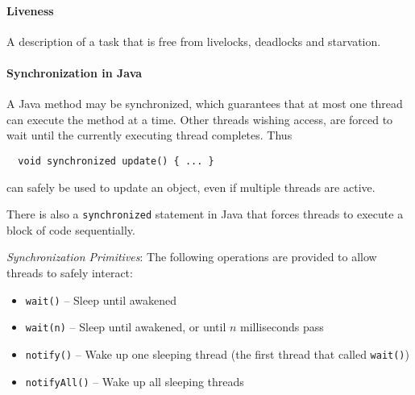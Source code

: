 \paragraph{Liveness} A description of a task that is free from livelocks, deadlocks and starvation.



\paragraph{Synchronization in Java} A Java method may be synchronized, which guarantees that at most one thread can execute the method at a time. Other threads wishing access, are forced to wait until the currently executing thread completes. Thus
%
\begin{lstlisting}
  void synchronized update() { ... }
\end{lstlisting}
%
can safely be used to update an object, even if multiple threads are active.

There is also a \verb|synchronized| statement in Java that forces threads to execute a block of code sequentially.

\textit{Synchronization Primitives}:
The following operations are provided to allow threads to safely interact:
\begin{itemize}[nolistsep,noitemsep]
  \item \verb|wait()| -- Sleep until awakened
  \item\verb|wait(n)| -- Sleep until awakened, or until $n$ milliseconds pass
  \item\verb|notify()| -- Wake up one sleeping thread (the first thread that called \verb|wait()|)
  \item \verb|notifyAll()| -- Wake up all sleeping threads
\end{itemize}

